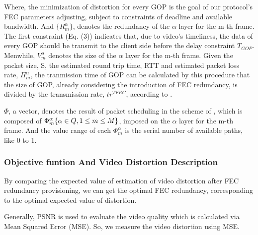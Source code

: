 Where, the minimization of distortion for every GOP is the goal of our protocol's FEC parameters adjusting, subject to constraints of deadline and available bandwidth. And $\{ R_m^\alpha \}$, denotes the redundancy of the $\alpha$ layer for the m-th frame. The first constraint (Eq. (3)) indicates that, due to video's timeliness, the data of every GOP should be transmit to the client side before the delay constraint $T_{GOP}$.
Menwhile, ${V_m^\alpha }$ denotes the size of the $\alpha$ layer for the m-th frame. Given the packet size, S, the estimated round trip time, RTT and estimated packet loss rate, $\Pi_m^\alpha$, the tranmission time of GOP can be calculated by this procedure that the size of GOP, already considering the introduction of FEC redundancy, is divided by the transmission rate, $t{r^{TFRC}}$, according to \cite{TRFC}. 

$\Phi$, a vector, denotes the result of packet scheduling in the scheme of \cite{MPMTP}, which is composed of $\Phi
_m^\alpha {\rm{\{ }}\alpha  \in Q,1 \le m \le M{\rm{\} }}$,  imposed on the $\alpha$ layer for the m-th frame. And the value range of each $\Phi _m^\alpha $ is the serial number of available paths, like 0 to 1.










\subsubsection{Objective funtion And Video Distortion Description}


By comparing the expected value of estimation of video distortion after FEC redundancy provisioning, we can get the optimal FEC redundancy, corresponding to the optimal expected value of distortion. 

Generally, PSNR is used to evaluate the video quality which is calculated via Mean Squared Error (MSE). So, we measure the video distortion using MSE. 

